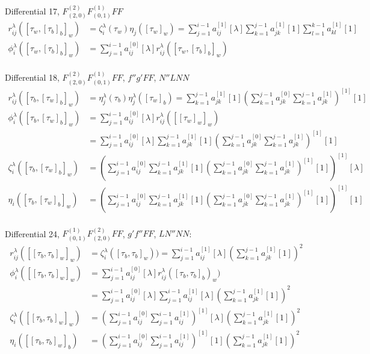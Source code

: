 \documentclass[english,unicode]{article}
\def\SiIL{\sum_{j=1}^{i-1}a_{ij}^{[1]}[\lambda]}
\def\SjIO{\sum_{k=1}^{j-1}a_{jk}^{[1]}[1]}
\def\SkIO{\sum_{l=1}^{k-1}a_{kl}^{[1]}[1]}
\begin{document}
Differential  17, $F^{(2)}_{(2,0)}F^{(1)}_{(0,1)}FF$
\begin{align*}
r_{ij}^\lambda([\tau_w,[\tau_b]_b]_w)& =\zeta_i^\lambda(\tau_w)\eta_j([\tau_w]_w)=\SiIL\SjIO \SkIO\\
\phi_i^\lambda([\tau_w,[\tau_b]_b]_w) &= \sum_{j=1}^{i-1}a_{ij}^{[0]}[\lambda]r_{ij}^\lambda ([\tau_w,[\tau_b]_b]_w)\\
\end{align*}

Differential 18, $F^{(2)}_{(2,0)}F^{(1)}_{(0,1)}FF$, $f''g'FF $, $N''LNN$ 
\begin{align*}
r_{ij}^\lambda([\tau_b,[\tau_w]_b]_w)& =\eta_j^\lambda(\tau_b)\eta_j^\lambda([\tau_w]_b)=\sum_{k=1}^{j-1}a_{jk}^{[1]}[1](\sum_{k=1}^{j-1}a_{jk}^{[0]}\sum_{k=1}^{j-1}a_{jk}^{[1]})^{[1]}[1]\\
\phi_i^\lambda([\tau_b,[\tau_w]_b]_w) &= \sum_{j=1}^{i-1}a_{ij}^{[0]}[\lambda]r_{ij}^\lambda ([[\tau_w]_w]_w)\\
&= \sum_{j=1}^{i-1}a_{ij}^{[0]}[\lambda]\sum_{k=1}^{j-1}a_{jk}^{[1]}[1](\sum_{k=1}^{j-1}a_{jk}^{[0]}\sum_{k=1}^{j-1}a_{jk}^{[1]})^{[1]}[1]\\
\zeta_i^\lambda([\tau_b,[\tau_w]_b]_w) & = (\sum_{j=1}^{i-1}a_{ij}^{[0]}\sum_{k=1}^{j-1}a_{jk}^{[1]}[1](\sum_{k=1}^{j-1}a_{jk}^{[0]}\sum_{k=1}^{j-1}a_{jk}^{[1]})^{[1]}[1])^{[1]}[\lambda]\\
\eta_i([\tau_b,[\tau_w]_b]_w) & = (\sum_{j=1}^{i-1}a_{ij}^{[0]}\sum_{k=1}^{j-1}a_{jk}^{[1]}[1](\sum_{k=1}^{j-1}a_{jk}^{[0]}\sum_{k=1}^{j-1}a_{jk}^{[1]})^{[1]}[1])^{[1]}[1]\\
\end{align*}

Differential 24, $F^{(1)}_{(0,1)}F^{(2)}_{(2,0)}FF$, $g'f''FF$,  $LN''NN$:
\begin{align*}
r_{ij}^\lambda([[\tau_b,\tau_b]_w]_w)& =\zeta_i^{\lambda}([\tau_b,\tau_b]_w)) =\sum_{j=1}^{i-1}a_{ij}^{[1]}[\lambda](\sum_{k=1}^{j-1} a_{jk}^{[1]}[1])^2\\
\phi_i^\lambda([[\tau_b,\tau_b]_w]_w) &= \sum_{j=1}^{i-1}a_{ij}^{[0]}[\lambda]r_{ij}^\lambda ([\tau_b,\tau_b]_b)_w)\\
& = \sum_{j=1}^{i-1}a_{ij}^{[0]}[\lambda]\sum_{j=1}^{i-1}a_{ij}^{[1]}[\lambda](\sum_{k=1}^{j-1} a_{jk}^{[1]}[1])^2\\
\zeta_i^\lambda([[\tau_b,\tau_b]_w]_w) & =(\sum_{j=1}^{i-1}a_{ij}^{[0]}\sum_{j=1}^{i-1}a_{ij}^{[1]})^{[1]}[\lambda](\sum_{k=1}^{j-1} a_{jk}^{[1]}[1])^2\\
\eta_i([[\tau_b,\tau_b]_w]_b) & =(\sum_{j=1}^{i-1}a_{ij}^{[0]}\sum_{j=1}^{i-1}a_{ij}^{[1]})^{[1]}[1](\sum_{k=1}^{j-1} a_{jk}^{[1]}[1])^2\\
\end{align*}
\end{document}
